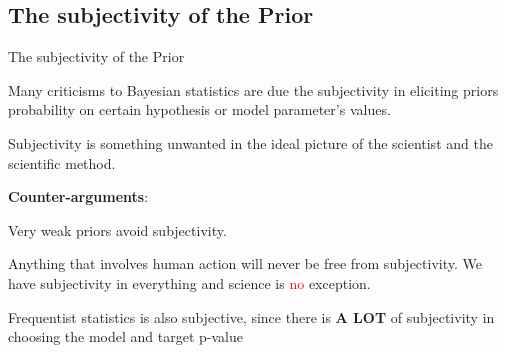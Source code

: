 \subsection{The subjectivity of the Prior}
\begin{frame}{The subjectivity of the Prior}
	\begin{vfilleditems}
		\item Many criticisms to Bayesian statistics are due the subjectivity
		in eliciting priors probability on certain hypothesis or model parameter's values.
		\item Subjectivity is something unwanted in the ideal picture of the
		scientist and the scientific method.
	\end{vfilleditems}
	\textbf{Counter-arguments}:
	\begin{vfilleditems}
		\item Very weak priors avoid subjectivity.
		\item Anything that involves human action will never be free from
		subjectivity.
		We have subjectivity in everything and science is \textcolor{red}{no} exception.
		\item Frequentist statistics is also subjective, since there is \textbf{A LOT} of subjectivity in
		choosing the model and target p-value \parencite{jaynesProbabilityTheoryLogic2003, vandeschootBayesianStatisticsModelling2021}
	\end{vfilleditems}
\end{frame}


